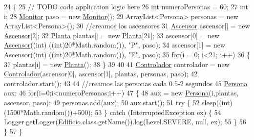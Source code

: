 \begin{DoxyCode}
24                                            \{
25         \textcolor{comment}{// TODO code application logic here}
26         \textcolor{keywordtype}{int} numeroPersonas = 60;
27         \textcolor{keywordtype}{int} i;
28         \mbox{\hyperlink{classpecl6part1_1_1_monitor}{Monitor}} paso = \textcolor{keyword}{new} \mbox{\hyperlink{classpecl6part1_1_1_monitor}{Monitor}}();
29         ArrayList<Persona> personas = \textcolor{keyword}{new} ArrayList<Persona>();
30         \textcolor{comment}{//creamos los ascensores}
31         \mbox{\hyperlink{classpecl6part1_1_1_ascensor}{Ascensor}} ascensor[] = \textcolor{keyword}{new} \mbox{\hyperlink{classpecl6part1_1_1_ascensor}{Ascensor}}[2];
32         \mbox{\hyperlink{classpecl6part1_1_1_planta}{Planta}} plantas[] = \textcolor{keyword}{new} \mbox{\hyperlink{classpecl6part1_1_1_planta}{Planta}}[21];
33         ascensor[0] = \textcolor{keyword}{new} \mbox{\hyperlink{classpecl6part1_1_1_ascensor}{Ascensor}}((\textcolor{keywordtype}{int}) ((\textcolor{keywordtype}{int})20*Math.random()), \textcolor{stringliteral}{"P"}, paso);
34         ascensor[1] = \textcolor{keyword}{new} \mbox{\hyperlink{classpecl6part1_1_1_ascensor}{Ascensor}}((\textcolor{keywordtype}{int}) ((\textcolor{keywordtype}{int})20*Math.random()), \textcolor{stringliteral}{"E"}, paso);
35         \textcolor{keywordflow}{for}(i = 0; i<21; i++)
36         \{
37             plantas[i] = \textcolor{keyword}{new} \mbox{\hyperlink{classpecl6part1_1_1_planta}{Planta}}();
38         \}
39         
40         
41         \mbox{\hyperlink{classpecl6part1_1_1_controlador}{Controlador}} controlador = \textcolor{keyword}{new} \mbox{\hyperlink{classpecl6part1_1_1_controlador}{Controlador}}(ascensor[0], ascensor[1], plantas, 
      personas, paso);
42         controlador.start();
43         
44         \textcolor{comment}{//creamos las personas cada 0.5-2 segundos}
45         \mbox{\hyperlink{classpecl6part1_1_1_persona}{Persona}} aux;
46         \textcolor{keywordflow}{for}(i=0;i<numeroPersonas;i++)
47         \{
48             aux = \textcolor{keyword}{new} \mbox{\hyperlink{classpecl6part1_1_1_persona}{Persona}}(i,plantas, ascensor, paso);
49             personas.add(aux);
50             aux.start();
51             \textcolor{keywordflow}{try} \{
52                 sleep((\textcolor{keywordtype}{int})(1500*Math.random())+500);
53             \} \textcolor{keywordflow}{catch} (InterruptedException ex) \{
54                 Logger.getLogger(\mbox{\hyperlink{classpecl6part1_1_1_edificio}{Edificio}}.class.getName()).log(Level.SEVERE, null, ex);
55             \}
56         \}
57     \}
\end{DoxyCode}
